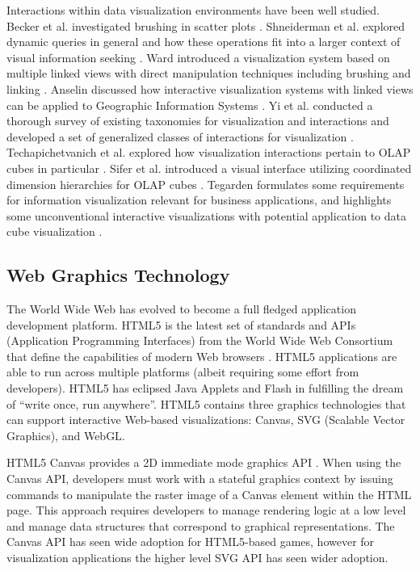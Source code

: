 \documentclass[12pt]{article}
\begin{document}
\begin{doublespace}
Interactions within data visualization environments have been well studied. Becker et al. investigated brushing in scatter plots \cite{becker1987brushing}. Shneiderman et al. explored dynamic queries in general and how these operations fit into a larger context of visual information seeking \cite{shneiderman1994dynamic}. Ward introduced a visualization system based on multiple linked views with direct manipulation techniques including brushing and linking \cite{ward1994xmdvtool}. Anselin discussed how interactive visualization systems with linked views can be applied to Geographic Information Systems \cite{anselin1999interactive}. Yi et al. conducted a thorough survey of existing taxonomies for visualization and interactions and developed a set of generalized classes of interactions for visualization \cite{yi2007toward}. Techapichetvanich et al. explored how visualization interactions pertain to OLAP cubes in particular \cite{techapichetvanich2005interactive}. Sifer et al. introduced a visual interface utilizing coordinated dimension hierarchies for OLAP cubes \cite{sifer2003visual}. Tegarden formulates some requirements for information visualization relevant for business applications, and highlights some unconventional interactive visualizations with potential application to data cube visualization \cite{tegarden1999business}.

\subsection{Web Graphics Technology}

The World Wide Web has evolved to become a full fledged application development platform. HTML5 is the latest set of standards and APIs (Application Programming Interfaces) from the World Wide Web Consortium that define the capabilities of modern Web browsers \cite{html5}. HTML5 applications are able to run across multiple platforms (albeit requiring some effort from developers). HTML5 has eclipsed Java Applets and Flash in fulfilling the dream of ``write once, run anywhere''. HTML5 contains three graphics technologies that can support interactive Web-based visualizations: Canvas, SVG (Scalable Vector Graphics), and WebGL.

HTML5 Canvas provides a 2D immediate mode graphics API \cite{fulton2013html5}. When using the Canvas API, developers must work with a stateful graphics context by issuing commands to manipulate the raster image of a Canvas element within the HTML page. This approach requires developers to manage rendering logic at a low level and manage data structures that correspond to graphical representations. The Canvas API has seen wide adoption for HTML5-based games, however for visualization applications the higher level SVG API has seen wider adoption.


\end{doublespace}
\end{document}
